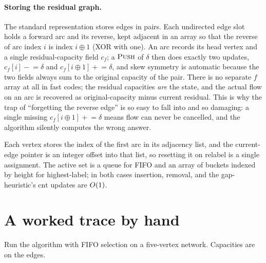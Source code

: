 \begin{algorithm}[H]
\caption{$\textsc{Discharge}(u)$ -- push out all of $u$'s excess, relabeling as needed}
\label{ch13:alg-discharge}
\DontPrintSemicolon
{}
\end{algorithm}

\paragraph{Storing the residual graph.} The standard representation stores edges in pairs. Each undirected edge slot holds a forward arc and its reverse, kept adjacent in an array so that the reverse of arc index $i$ is index $i\oplus 1$ (XOR with one). An arc records its head vertex and a single residual-capacity field $c_f$; a $\textsc{Push}$ of $\delta$ then does exactly two updates, $c_f[i]\mathrel{-}=\delta$ and $c_f[i\oplus1]\mathrel{+}=\delta$, and skew symmetry is automatic because the two fields always sum to the original capacity of the pair. There is no separate $f$ array at all in fast codes; the residual capacities \emph{are} the state, and the actual flow on an arc is recovered as original-capacity minus current residual. This is why the trap of ``forgetting the reverse edge'' is so easy to fall into and so damaging: a single missing $c_f[i\oplus1]\mathrel{+}=\delta$ means flow can never be cancelled, and the algorithm silently computes the wrong answer.

Each vertex stores the index of the first arc in its adjacency list, and the current-edge pointer is an integer offset into that list, so resetting it on relabel is a single assignment. The active set is a queue for FIFO and an array of buckets indexed by height for highest-label; in both cases insertion, removal, and the gap-heuristic's $\mathrm{cnt}$ updates are $O(1)$.

\section{A worked trace by hand}
\label{ch13:trace}

Run the algorithm with FIFO selection on a five-vertex network. Capacities are on the edges.

